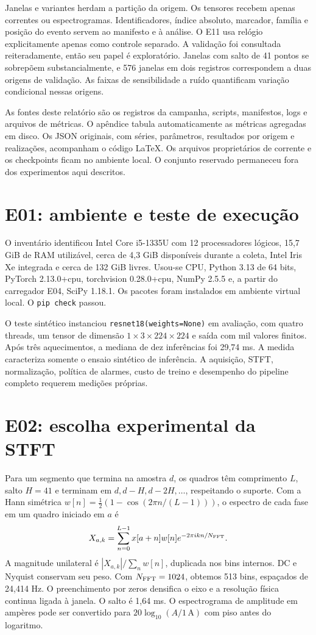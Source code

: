 \documentclass[11pt,a4paper]{article}
\newcommand{\codigo}[1]{\texttt{#1}}
\begin{document}
Janelas e variantes herdam a partição da origem. Os tensores recebem apenas correntes ou espectrogramas. Identificadores, índice absoluto, marcador, família e posição do evento servem ao manifesto e à análise. O E11 usa relógio explicitamente apenas como controle separado. A validação foi consultada reiteradamente, então seu papel é exploratório. Janelas com salto de 41 pontos se sobrepõem substancialmente, e 576 janelas em dois registros correspondem a duas origens de validação. As faixas de sensibilidade a ruído quantificam variação condicional nessas origens.

As fontes deste relatório são os registros da campanha, scripts, manifestos, logs e arquivos de métricas. O apêndice tabula automaticamente as métricas agregadas em disco. Os JSON originais, com séries, parâmetros, resultados por origem e realizações, acompanham o código LaTeX. Os arquivos proprietários de corrente e os checkpoints ficam no ambiente local. O conjunto reservado permaneceu fora dos experimentos aqui descritos.

\section{E01: ambiente e teste de execução}
O inventário identificou Intel Core i5-1335U com 12 processadores lógicos, 15,7 GiB de RAM utilizável, cerca de 4,3 GiB disponíveis durante a coleta, Intel Iris Xe integrada e cerca de 132 GiB livres. Usou-se CPU, Python 3.13 de 64 bits, PyTorch 2.13.0+cpu, torchvision 0.28.0+cpu, NumPy 2.5.5 e, a partir do carregador E04, SciPy 1.18.1. Os pacotes foram instalados em ambiente virtual local. O \codigo{pip check} passou.

O teste sintético instanciou \codigo{resnet18(weights=None)} em avaliação, com quatro threads, um tensor de dimensão $1\times3\times224\times224$ e saída com mil valores finitos. Após três aquecimentos, a mediana de dez inferências foi 29,74 ms. A medida caracteriza somente o ensaio sintético de inferência. A aquisição, STFT, normalização, política de alarmes, custo de treino e desempenho do pipeline completo requerem medições próprias.

\section{E02: escolha experimental da STFT}
Para um segmento que termina na amostra $d$, os quadros têm comprimento $L$, salto $H=41$ e terminam em $d,d-H,d-2H,\ldots$, respeitando o suporte. Com a Hann simétrica $w[n]=\tfrac12(1-\cos(2\pi n/(L-1)))$, o espectro de cada fase em um quadro iniciado em $a$ é
\[
 X_{a,k}=\sum_{n=0}^{L-1}x[a+n]w[n]e^{-2\pi i kn/N_{\rm FFT}}.
\]
A magnitude unilateral é $|X_{a,k}|/\sum_n w[n]$, duplicada nos bins internos. DC e Nyquist conservam seu peso. Com $N_{\rm FFT}=1024$, obtemos 513 bins, espaçados de 24,414 Hz. O preenchimento por zeros densifica o eixo e a resolução física continua ligada à janela. O salto é 1,64 ms. O espectrograma de amplitude em ampères pode ser convertido para $20\log_{10}(A/1\,\mathrm{A})$ com piso antes do logaritmo.
\end{document}
